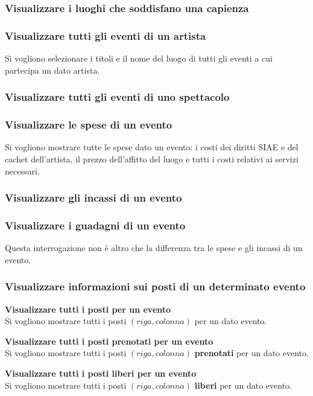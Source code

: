 \documentclass[a4paper,11pt]{article}
\begin{document}
\subsubsection{Visualizzare i luoghi che soddisfano una capienza}


\subsubsection{Visualizzare tutti gli eventi di un artista}
Si vogliono selezionare i titoli e il nome del luogo di tutti gli eventi a cui
partecipa un dato artista.


\subsubsection{Visualizzare tutti gli eventi di uno spettacolo}


\subsubsection{Visualizzare le spese di un evento}
Si vogliono mostrare tutte le spese dato un evento: i costi dei diritti SIAE e del
cachet dell'artista, il prezzo dell'affitto del luogo e tutti i costi relativi ai
servizi necessari.


\subsubsection{Visualizzare gli incassi di un evento}


\subsubsection{Visualizzare i guadagni di un evento}
Questa interrogazione non è altro che la differenza tra le spese e gli incassi di un evento.


\subsubsection{Visualizzare informazioni sui posti di un determinato evento}

\textbf{Visualizzare tutti i posti per un evento}\\
Si vogliono mostrare tutti i posti $(riga, colonna)$ per un dato evento.

\textbf{Visualizzare tutti i posti prenotati per un evento}\\
Si vogliono mostrare tutti i posti $(riga, colonna)$ \textbf{prenotati} per un dato evento.

\textbf{Visualizzare tutti i posti liberi per un evento}\\
Si vogliono mostrare tutti i posti $(riga, colonna)$ \textbf{liberi} per un dato evento.

\end{document}
